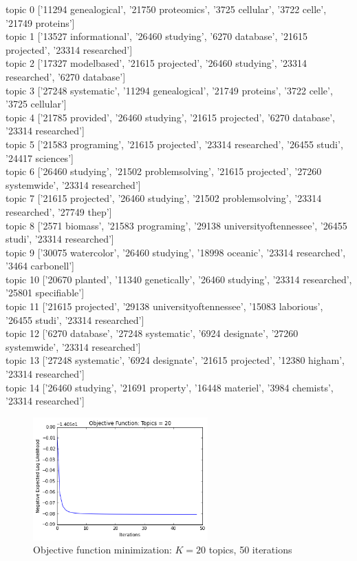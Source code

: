 \documentclass[submit]{harvardml}
\begin{document}
\noindent
topic 0 ['11294 genealogical', '21750 proteomics', '3725 cellular', '3722 celle', '21749 proteins'] \\
topic 1 ['13527 informational', '26460 studying', '6270 database', '21615 projected', '23314 researched'] \\
topic 2 ['17327 modelbased', '21615 projected', '26460 studying', '23314 researched', '6270 database'] \\
topic 3 ['27248 systematic', '11294 genealogical', '21749 proteins', '3722 celle', '3725 cellular'] \\
topic 4 ['21785 provided', '26460 studying', '21615 projected', '6270 database', '23314 researched'] \\
topic 5 ['21583 programing', '21615 projected', '23314 researched', '26455 studi', '24417 sciences'] \\
topic 6 ['26460 studying', '21502 problemsolving', '21615 projected', '27260 systemwide', '23314 researched'] \\
topic 7 ['21615 projected', '26460 studying', '21502 problemsolving', '23314 researched', '27749 thep'] \\
topic 8 ['2571 biomass', '21583 programing', '29138 universityoftennessee', '26455 studi', '23314 researched'] \\
topic 9 ['30075 watercolor', '26460 studying', '18998 oceanic', '23314 researched', '3464 carbonell'] \\
topic 10 ['20670 planted', '11340 genetically', '26460 studying', '23314 researched', '25801 specifiable'] \\
topic 11 ['21615 projected', '29138 universityoftennessee', '15083 laborious', '26455 studi', '23314 researched'] \\
topic 12 ['6270 database', '27248 systematic', '6924 designate', '27260 systemwide', '23314 researched'] \\
topic 13 ['27248 systematic', '6924 designate', '21615 projected', '12380 higham', '23314 researched'] \\
topic 14 ['26460 studying', '21691 property', '16448 materiel', '3984 chemists', '23314 researched'] \\

\newpage

\begin{figure}
	\centering
	\includegraphics[width=0.6\textwidth]{output_8_2.png}
	\caption{Objective function minimization: $K = 20$ topics, 50 iterations}
\end{figure}
\end{document}
